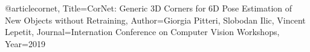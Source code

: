 @article{cornet,
Title={CorNet: Generic 3D Corners for 6D Pose Estimation of New Objects without Retraining},
Author={Giorgia Pitteri, Slobodan Ilic, Vincent Lepetit},
Journal={Internation Conference on Computer Vision Workshops},
Year={2019}} 
